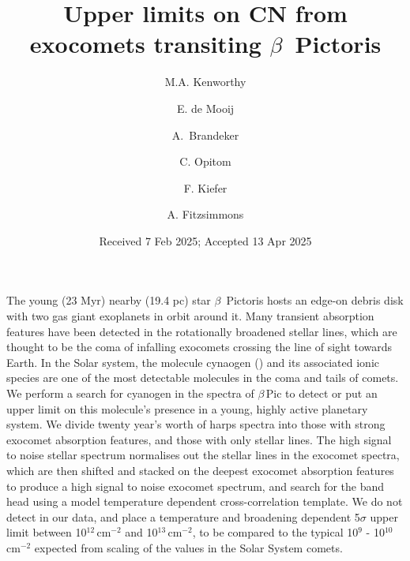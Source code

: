 \documentclass{aa}
\newcommand{\bp}{$\beta$\,Pic}
\begin{document}
 
   \title{Upper limits on CN from exocomets transiting $\beta$~Pictoris}
   \author{M.A. Kenworthy
          \and
          E. de Mooij
          \and
          A.\ Brandeker
          \and 
         C. Opitom
          \and
          F. Kiefer
          \and
          A. Fitzsimmons 
          }

   \date{Received 7 Feb 2025; Accepted 13 Apr 2025}

 
  \abstract
   {The young (23 Myr) nearby (19.4 pc) star $\beta$~Pictoris hosts an edge-on debris disk with two gas giant exoplanets in orbit around it.
   Many transient absorption features have been detected in the rotationally broadened stellar lines, which are thought to be the coma of infalling exocomets crossing the line of sight towards Earth.}
   {In the Solar system, the molecule cynaogen () and its associated ionic species are one of the most detectable molecules in the coma and tails of comets.
   We perform a search for cyanogen in the spectra of \bp{} to detect or put an upper limit on this molecule's presence in a young, highly active planetary system.}
   {We divide twenty year's worth of \ac{harps} spectra into those with strong exocomet absorption features, and those with only stellar lines.
   The high signal to noise stellar spectrum normalises out the stellar lines in the exocomet spectra, which are then shifted and stacked on the deepest exocomet absorption features to produce a high signal to noise exocomet spectrum, and search for the  band head using a model temperature dependent cross-correlation template.}
   {We do not detect  in our data, and place a temperature and broadening dependent 5$\sigma$ upper limit between 10$^{12}$\,cm$^{-2}$ and 10$^{13}$\,cm$^{-2}$, to be compared to the typical 10$^9$ - 10$^{10}$ cm$^{-2}$ expected from scaling of the values in the Solar System comets.}
\end{document}
